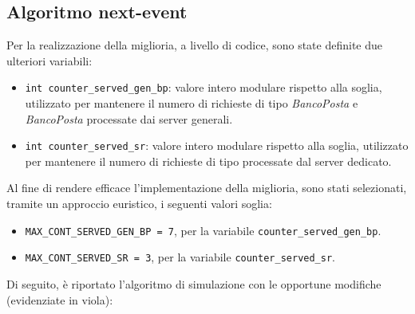 \subsection{Algoritmo next-event}
Per la realizzazione della miglioria, a livello di codice, sono state definite due ulteriori variabili:
\begin{itemize}
\item \texttt{{\color{code_purple}int} counter\_served\_gen\_bp}: valore intero modulare rispetto alla soglia, utilizzato per mantenere il numero di richieste di tipo \uo{} \textsl{BancoPosta} e \pp{} \textsl{BancoPosta} processate dai server generali.
\item \texttt{{\color{code_purple}int} counter\_served\_sr}: valore intero modulare rispetto alla soglia, utilizzato per mantenere il numero di richieste di tipo \sr{} processate dal server dedicato.
\end{itemize}
Al fine di rendere efficace l'implementazione della miglioria, sono stati selezionati, tramite un approccio euristico, i seguenti valori soglia:
\begin{itemize}
\item \texttt{MAX\_CONT\_SERVED\_GEN\_BP = 7}, per la variabile \texttt{counter\_served\_gen\_bp}.
\item \texttt{MAX\_CONT\_SERVED\_SR = 3}, per la variabile \texttt{counter\_served\_sr}.
\end{itemize}
Di seguito, è riportato l'algoritmo di simulazione con le opportune modifiche (evidenziate in {\color{purple}viola}):

